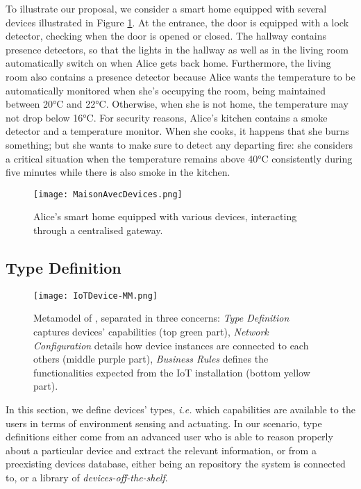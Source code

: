To illustrate our proposal, we consider a smart home equipped with several devices illustrated in Figure \ref{fig:RE}. At the entrance, the door is equipped with a lock detector, checking when the door is opened or closed. The hallway contains presence detectors, so that the lights in the hallway as well as in the living room automatically switch on when Alice gets back home. Furthermore, the living room also contains a presence detector because Alice wants the temperature to be automatically monitored when she's occupying the room, being maintained between 20°C and 22°C. Otherwise, when she is not home, the temperature may not drop below 16°C. For security reasons, Alice's kitchen contains a smoke detector and a temperature monitor. When she cooks, it happens that she burns something; but she wants to make sure to detect any departing fire: she considers a critical situation when the temperature remains above 40°C consistently during five minutes while there is also smoke in the kitchen. 

\begin{figure}[!h]%
  \texttt{[image: MaisonAvecDevices.png]}%
  \caption{Alice's smart home equipped with various devices, interacting through a centralised gateway.}%
  \label{fig:RE}%
\end{figure}



\subsection{Type Definition}
\label{sec:IoTDSL-Type}

\begin{figure*}%
  \centering  
  \texttt{[image: IoTDevice-MM.png]}%
  \caption{Metamodel of \IOTDSL, separated in three concerns: \emph{Type Definition} captures devices' capabilities (top green part), \emph{Network Configuration} details how device instances are connected to each others (middle purple part), \emph{Business Rules} defines the functionalities expected from the IoT installation (bottom yellow part).}%
  \label{fig:IoTDevice-MM}%
\end{figure*}


In this section, we define \IOT devices' types, \textit{i.e.} which capabilities are available to the users in terms of environment sensing and actuating. In our scenario, type definitions either come from an advanced user who is able to reason properly about a particular device and extract the relevant information, or from a preexisting devices database, either being an repository the system is connected to, or a library of \textit{devices-off-the-shelf}. 

